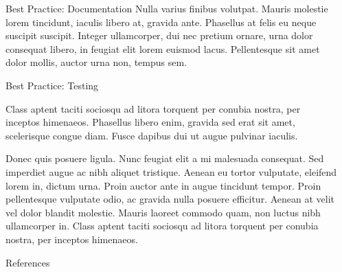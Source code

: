 \documentclass[final]{beamer}
\newlength{\sepwidth}
\newlength{\colwidth}
\newcommand{\separatorcolumn}{\begin{column}{\sepwidth}\end{column}}
\begin{document}
\begin{frame}[t]
\begin{columns}[t]
\begin{column}{\colwidth}
\begin{block}{Best Practice: Documentation}
    Nulla varius finibus volutpat. Mauris molestie lorem tincidunt, iaculis
    libero at, gravida ante. Phasellus at felis eu neque suscipit suscipit.
    Integer ullamcorper, dui nec pretium ornare, urna dolor consequat libero,
    in feugiat elit lorem euismod lacus. Pellentesque sit amet dolor mollis,
    auctor urna non, tempus sem.

  \end{block}

  \begin{block}{Best Practice: Testing}

    Class aptent taciti sociosqu ad litora torquent per conubia nostra, per
    inceptos himenaeos. Phasellus libero enim, gravida sed erat sit amet,
    scelerisque congue diam. Fusce dapibus dui ut augue pulvinar iaculis.

    Donec quis posuere ligula. Nunc feugiat elit a mi malesuada consequat. Sed
    imperdiet augue ac nibh aliquet tristique. Aenean eu tortor vulputate,
    eleifend lorem in, dictum urna. Proin auctor ante in augue tincidunt
    tempor. Proin pellentesque vulputate odio, ac gravida nulla posuere
    efficitur. Aenean at velit vel dolor blandit molestie. Mauris laoreet
    commodo quam, non luctus nibh ullamcorper in. Class aptent taciti sociosqu
    ad litora torquent per conubia nostra, per inceptos himenaeos.

  \end{block}

  \begin{block}{References}

    \nocite{*}
    \footnotesize{}

  \end{block}

\end{column}

\separatorcolumn
\end{columns}
\end{frame}
\end{document}
